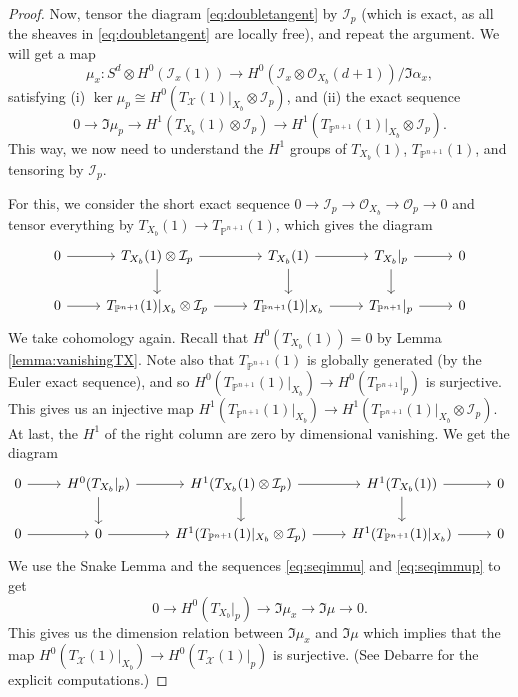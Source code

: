 \documentclass[leqno, openany]{memoir}
\theoremstyle{definition}
\theoremstyle{remark}
\theoremstyle{plain}
\theoremstyle{definition}
\theoremstyle{remark}
\renewcommand{\P}{\mathbb{P}}
\newcommand{\mc}[1]{\mathcal{#1}}
\begin{document}
\begin{proof}
    Now, tensor the diagram \eqref{eq:doubletangent} by $\mc{I}_p$ (which is exact, as all the sheaves in \eqref{eq:doubletangent} are locally free), and repeat the argument. We will get a map
    \[ \mu_x\colon S^d \otimes H^0(\mc{I}_x(1)) \to H^0(\mc{I}_x \otimes \mc{O}_{X_b}(d+1))/\Im \alpha_x, \]
    satisfying (i) $\ker \mu_p \cong H^0(T_{ \mc{X} }(1)|_{X_b} \otimes \mc{I}_p)$, and (ii) the exact sequence
\begin{equation} \label{eq:seqimmup}
    0 \to \Im \mu_p \to H^1(T_{X_b}(1) \otimes \mc{I}_p) \to H^1(T_{\P^{n+1}}(1)|_{X_b} \otimes \mc{I}_p).
\end{equation}
    This way, we now need to understand the $H^1$ groups of $T_{X_b}(1)$, $T_{\P^{n+1}}(1)$, and tensoring by $\mc{I}_p$.

    For this, we consider the short exact sequence $0 \to \mc{I}_p \to \mc{O}_{X_b} \to \mc{O}_p \to 0$ and tensor everything by $T_{X_b}(1) \to T_{\P^{n+1}}(1)$, which gives the diagram
\begin{equation} \label{eq:tangentsubscheme}
\begin{tikzcd}
    0 \arrow[r] & T_{X_b}(1) \otimes \mc{I}_p \arrow[r] \arrow[d] & T_{X_b}(1) \arrow[r] \arrow[d] & T_{X_b}|_p \arrow[r] \arrow[d] & 0 \\ 
    0 \arrow[r] & T_{\P^{n+1}}(1)|_{X_b} \otimes \mc{I}_p \arrow[r] & T_{\P^{n+1}}(1)|_{X_b} \arrow[r] & T_{\P^{n+1}}|_p \arrow[r] & 0 
\end{tikzcd}
\end{equation}
    We take cohomology again. Recall that $H^0(T_{X_b}(1))=0$ by Lemma \ref{lemma:vanishingTX}. Note also that $T_{\P^{n+1}}(1)$ is globally generated (by the Euler exact sequence), and so $H^0(T_{\P^{n+1}}(1)|_{X_b}) \to H^0(T_{\P^{n+1}}|_p)$ is surjective. This gives us an injective map $H^1(T_{\P^{n+1}}(1)|_{X_b}) \to H^1(T_{\P^{n+1}}(1)|_{X_b} \otimes \mc{I}_p)$. At last, the $H^1$ of the right column are zero by dimensional vanishing. We get the diagram
\[ \begin{tikzcd}
    0 \arrow[r] & H^0(T_{X_b}|_p) \arrow[r] \arrow[d] & H^1(T_{X_b}(1) \otimes \mc{I}_p) \arrow[r] \arrow[d] & H^1(T_{X_b}(1)) \arrow[r] \arrow[d] & 0 \\ 0 \arrow[r] & 0 \arrow[r] & H^1(T_{\P^{n+1}}(1)|_{X_b} \otimes \mc{I}_p) \arrow[r] & H^1(T_{\P^{n+1}}(1)|_{X_b}) \arrow[r] & 0
\end{tikzcd} \]
We use the Snake Lemma and the sequences \eqref{eq:seqimmu} and \eqref{eq:seqimmup} to get
\[ 0 \to H^0(T_{X_b}|_p) \to \Im \mu_x \to \Im \mu \to 0. \]
    This gives us the dimension relation between $\Im \mu_x$ and $\Im \mu$ which implies that the map $H^0(T_{ \mc{X} }(1)|_{X_b}) \to H^0(T_{ \mc{X} }(1)|_p)$ is surjective. (See Debarre for the explicit computations.)
\end{proof}
\end{document}
